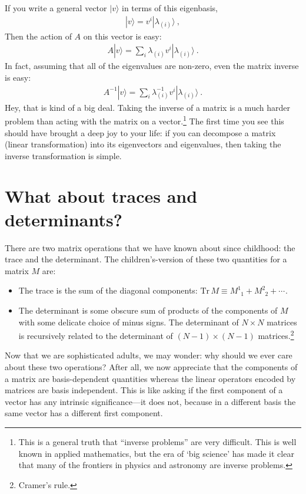 \documentclass[
  11pt,
	colorful,
	raggedright,
]{tufte-style-thesis-flip}
\newcommand{\aij}[2]{^{#1}_{\phantom{#1}#2}}
\begin{document}
If you write a general vector $|v\rangle$ in terms of this eigenbasis,
\begin{align}
  |v\rangle = v^i |\lambda_{(i)} \rangle \ ,
\end{align}
Then the action of $A$ on this vector is easy:
\begin{align}
  A |v\rangle = \sum_i \lambda_{(i)} v^i |\lambda_{(i)} \rangle \ .
\end{align}
In fact, assuming that all of the eigenvalues are non-zero, even the matrix inverse is easy:
\begin{align}
  A^{-1}|v\rangle = \sum_i \lambda_{(i)}^{-1} v^i |\lambda_{(i)} \rangle \ .
  \label{eq:linear:aglebra:inverse:eigenvectors}
\end{align}
Hey, that is kind of a big deal. Taking the inverse of a matrix is a much harder problem than acting with the matrix on a vector.\footnote{This is a general truth that ``inverse problems'' are very difficult. This is well known in applied mathematics, but the era of `big science' has made it clear that many of the frontiers in physics and astronomy are inverse problems.}
The first time you see this should have brought a deep joy to your life: if you can decompose a matrix (linear transformation) into its eigenvectors and eigenvalues, then taking the inverse transformation is simple.





\section{What about traces and determinants?}

There are two matrix operations that we have known about since childhood: the trace and the determinant. The children's-version of these two quantities for a matrix $M$ are:
\begin{itemize}
  \item The trace is the sum of the diagonal components: $\text{Tr}\,M \equiv M\aij{1}{1} + M\aij{2}{2}+\cdots_{}$.
  \item The determinant is some obscure sum of products of the components of $M$ with some delicate choice of minus signs. The determinant of $N\times N$ matrices is recursively related to the determinant of $(N-1)\times (N-1)$ matrices.\footnote{Cramer's rule.}
\end{itemize}
Now that we are sophisticated adults, we may wonder: why should we ever care about these two operations? After all, we now appreciate that the components of a matrix are basis-dependent quantities whereas the linear operators encoded by matrices are basis independent. This is like asking if the first component of a vector has any intrinsic significance---it does not, because in a different basis the same vector has a different first component.
\end{document}
